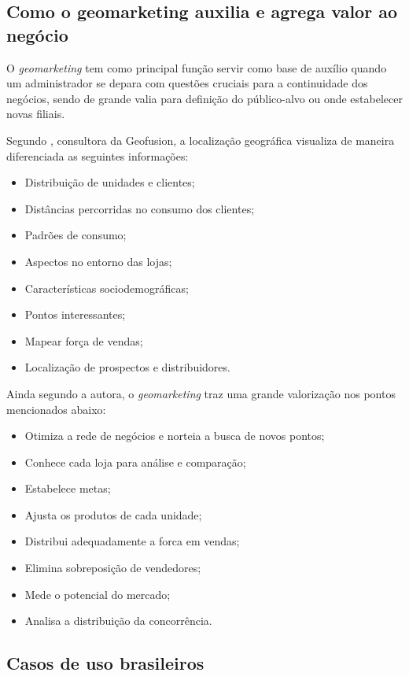 \subsection{Como o geomarketing auxilia e agrega valor ao negócio}
O \emph{geomarketing} tem como principal função servir como base de auxílio quando um administrador se depara com questões cruciais para a continuidade dos negócios, sendo de grande valia para definição do público-alvo ou onde estabelecer novas filiais.

Segundo , consultora da Geofusion, a localização geográfica visualiza de maneira diferenciada as seguintes informações:

\begin{itemize}
  \item Distribuição de unidades e clientes;
  \item Distâncias percorridas no consumo dos clientes;
  \item Padrões de consumo;
  \item Aspectos no entorno das lojas;
  \item Características sociodemográficas;
  \item Pontos interessantes;
  \item Mapear força de vendas;
  \item Localização de prospectos e distribuidores.
\end{itemize}

Ainda segundo a autora, o \emph{geomarketing} traz uma grande valorização nos pontos mencionados abaixo:

\begin{itemize}
  \item Otimiza a rede de negócios e norteia a busca de novos pontos;
  \item Conhece cada loja para análise e comparação;
  \item Estabelece metas;
  \item Ajusta os produtos de cada unidade;
  \item Distribui adequadamente a forca em vendas;
  \item Elimina sobreposição de vendedores;
  \item Mede o potencial do mercado;
  \item Analisa a distribuição da concorrência.
\end{itemize}

\subsection{Casos de uso brasileiros}

